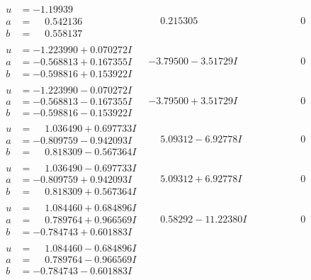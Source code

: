 \documentclass[1p]{elsarticle_modified}
\theoremstyle{definition}
\begin{document}
$$\begin{array}{c|c|c}
\begin{aligned}
u &= -1.19939\phantom{ +0.000000I} \\
a &= \phantom{-}0.542136\phantom{ +0.000000I} \\
b &= \phantom{-}0.558137\phantom{ +0.000000I}\end{aligned}
 & \phantom{-}0.215305\phantom{ +0.000000I} & \phantom{-0.000000 } 0 \\ \hline\begin{aligned}
u &= -1.223990 + 0.070272 I \\
a &= -0.568813 + 0.167355 I \\
b &= -0.598816 + 0.153922 I\end{aligned}
 & -3.79500 - 3.51729 I & \phantom{-0.000000 } 0 \\ \hline\begin{aligned}
u &= -1.223990 - 0.070272 I \\
a &= -0.568813 - 0.167355 I \\
b &= -0.598816 - 0.153922 I\end{aligned}
 & -3.79500 + 3.51729 I & \phantom{-0.000000 } 0 \\ \hline\begin{aligned}
u &= \phantom{-}1.036490 + 0.697733 I \\
a &= -0.809759 - 0.942093 I \\
b &= \phantom{-}0.818309 - 0.567364 I\end{aligned}
 & \phantom{-}5.09312 - 6.92778 I & \phantom{-0.000000 } 0 \\ \hline\begin{aligned}
u &= \phantom{-}1.036490 - 0.697733 I \\
a &= -0.809759 + 0.942093 I \\
b &= \phantom{-}0.818309 + 0.567364 I\end{aligned}
 & \phantom{-}5.09312 + 6.92778 I & \phantom{-0.000000 } 0 \\ \hline\begin{aligned}
u &= \phantom{-}1.084460 + 0.684896 I \\
a &= \phantom{-}0.789764 + 0.966569 I \\
b &= -0.784743 + 0.601883 I\end{aligned}
 & \phantom{-}0.58292 - 11.22380 I & \phantom{-0.000000 } 0 \\ \hline\begin{aligned}
u &= \phantom{-}1.084460 - 0.684896 I \\
a &= \phantom{-}0.789764 - 0.966569 I \\
b &= -0.784743 - 0.601883 I\end{aligned}

\end{array}$$
\end{document}
